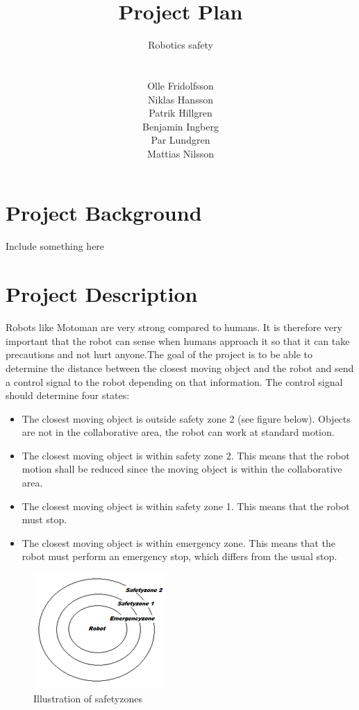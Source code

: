 \documentclass[10pt,a4paper]{article}
\title{Project Plan}
\author{\begin{large}{Robotics safety}\end{large}\\\\
Olle Fridolfsson\\  Niklas Hansson\\ Patrik Hillgren\\ Benjamin Ingberg\\ Par Lundgren\\ Mattias Nilsson}
\begin{document}
\maketitle
\newpage
\tableofcontents
\newpage
\noindent %
\section{Project Background}
Include something here
\section{Project Description}
Robots like Motoman are very strong compared to humans. It is therefore very important that the robot can sense when humans approach it so that it can take precautions and not hurt anyone.The goal of the project is to be able to determine the distance between the closest moving object and the robot and send a control signal to the robot depending on that information. The control signal should determine four states:

\begin{itemize}
  \item The closest moving object is outside safety zone 2 (see figure below). Objects are not in the collaborative area, the robot can work at standard motion.
  \item The closest moving object is within safety zone 2. This means that the robot motion shall be reduced since the moving object is within the collaborative area.
  \item The closest moving object is within safety zone 1. This means that the robot must stop.
  \item The closest moving object is within emergency zone. This means that the robot must perform an emergency stop, which differs from the usual stop.
\end{itemize}

\begin{figure}[H] 
  \centering
    \includegraphics{safetyzones.png}
    \caption{Illustration of safetyzones}
    \label{fig:safetyzone}
\end{figure}
\end{document}
